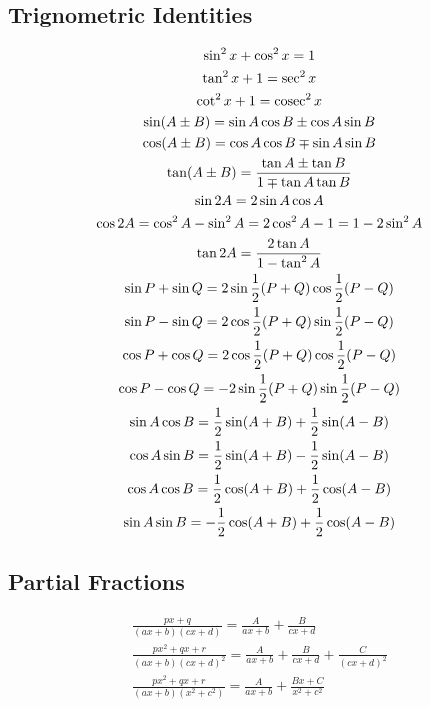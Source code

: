 \documentclass[12pt, a4paper]{article}
\begin{document}
\begin{multicols*}{3}
\subsection{Trignometric Identities}
\vspace{-1em}
\begin{gather*}
  \sin^2x + \cos^2x = 1\\
  \tan^2x + 1 = \sec^2x\\
  \cot^2x + 1=\operatorname{cosec}^2x\\
  \sin(A\pm B) = \sin A\cos B \pm \cos A\sin B\\
  \cos(A\pm B) = \cos A\cos B \mp \sin A\sin B\\
  \displaystyle \tan(A\pm B) = \frac{\tan A \pm \tan B}{1 \mp \tan A\tan B}\\
  \sin 2A = 2\sin A\cos A\\
  \cos 2A = \cos^2A -\sin^2A = 2\cos^2A-1 = 1-2\sin^2A\\
  \tan 2A = \frac{2\tan A}{1 -\tan^2 A}\\
  \sin P + \sin Q = 2\sin \frac{1}{2}(P+Q)\cos \frac{1}{2}(P-Q)\\
  \sin P - \sin Q = 2\cos \frac{1}{2}(P+Q)\sin \frac{1}{2}(P-Q)\\
  \cos P + \cos Q = 2\cos \frac{1}{2}(P+Q)\cos \frac{1}{2}(P-Q)\\
  \cos P - \cos Q = -2\sin \frac{1}{2}(P+Q)\sin \frac{1}{2}(P-Q)\\
  \sin A\cos B = \frac{1}{2}\sin(A+B) + \frac{1}{2}\sin(A-B)\\
  \cos A\sin B = \frac{1}{2}\sin(A+B) - \frac{1}{2}\sin(A-B)\\
  \cos A\cos B = \frac{1}{2}\cos(A+B) + \frac{1}{2}\cos(A-B)\\
  \sin A\sin B = -\frac{1}{2}\cos(A+B) + \frac{1}{2}\cos(A-B)
\end{gather*}
\subsection{Partial Fractions}
\vspace{-1em}
\begin{gather*}
  \frac{px+q}{(ax+b)(cx+d)} = \frac{A}{ax+b} + \frac{B}{cx+d}\\
  \frac{px^2+qx+r}{(ax+b)(cx+d)^2} = \frac{A}{ax+b} + \frac{B}{cx+d} + \frac{C}{(cx+d)^2}\\
  \frac{px^2+qx+r}{(ax+b)(x^2+c^2)} = \frac{A}{ax+b} + \frac{Bx+C}{x^2+c^2}\\
\end{gather*}


\end{multicols*}
\end{document}
